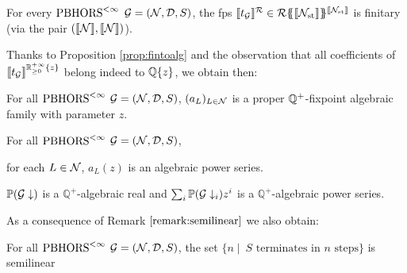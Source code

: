 \begin{proposition}
	\label{prop:finitefamily}
For every $\text{PBHORS}^{<\infty}$ $\mathcal{G}=(\mathcal{N},\mathcal{D},S)$, the fps
$\llbracket t_{\mathcal{G}}\rrbracket^{\mathcal{R}}\in {\mathcal{R}}\{\!\!\{\llbracket{\mathcal{N}}_{\mathrm{st}}\rrbracket\}\!\!\}^{\llbracket{\mathcal{N}}_{\mathrm{st}}\rrbracket}$ is finitary (via the pair $(\llbracket\mathcal{N}\rrbracket,\llbracket\mathcal{N}\rrbracket)$).
\end{proposition}

Thanks to Proposition \ref{prop:fintoalg} and the observation that all coefficients of $\llbracket t_{\mathcal{G}}\rrbracket^{{\mathbb{R}^{+\infty}_{\geq 0}}\{z\}}$ belong indeed to ${\mathbb{Q}}\{z\}$, we obtain then:
\begin{theorem}
	\label{Gfin-algebraic-theorem}
	For all $\text{PBHORS}^{<\infty}$ $\mathcal{G}=(\mathcal{N}, \mathcal{D}, S)$, $(a_L)_{L \in \mathcal{N}}$ is a proper $\mathbb{Q}^{+}$-fixpoint algebraic family with parameter $z$.
\end{theorem}
\begin{corollary}
	\label{Gfin-algebraic-corollary}
	 For all $\text{PBHORS}^{<\infty}$ $\mathcal{G}=(\mathcal{N}, \mathcal{D}, S)$,
	\begin{varenumerate}
\item for each $L \in \mathcal{N}$, $a_L(z)$ is an algebraic power series.  
\item $\mathbb P(\mathcal{G}\downarrow)$ is a $\mathbb Q^{+}$-algebraic real and 
 $\sum_i\mathbb P(\mathcal{G}\downarrow_i)z^i$ is a ${\mathbb Q^{+}}$-algebraic power series.
\end{varenumerate}
\end{corollary}
As a consequence of Remark $\ref{remark:semilinear}$ we also obtain:
\begin{corollary}
	For all $\text{PBHORS}^{<\infty}$ $\mathcal{G}=(\mathcal{N}, \mathcal{D}, S)$, the set $\{n \mid \:  S \text{ terminates in } n \text{ steps}  \}$
	is semilinear
\end{corollary}
